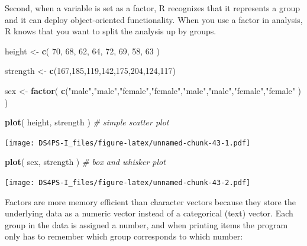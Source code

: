 \documentclass[]{book}
\newenvironment{Shaded}{\begin{snugshade}}{\end{snugshade}}
\newcommand{\CommentTok}[1]{\textcolor[rgb]{0.56,0.35,0.01}{\textit{#1}}}
\newcommand{\DecValTok}[1]{\textcolor[rgb]{0.00,0.00,0.81}{#1}}
\newcommand{\KeywordTok}[1]{\textcolor[rgb]{0.13,0.29,0.53}{\textbf{#1}}}
\newcommand{\NormalTok}[1]{#1}
\newcommand{\StringTok}[1]{\textcolor[rgb]{0.31,0.60,0.02}{#1}}
\theoremstyle{definition}
\theoremstyle{definition}
\theoremstyle{definition}
\theoremstyle{remark}
\begin{document}
Second, when a variable is set as a factor, R recognizes that it
represents a group and it can deploy object-oriented functionality. When
you use a factor in analysis, R knows that you want to split the
analysis up by groups.

\begin{Shaded}
\begin{Highlighting}[]
\NormalTok{height <-}\StringTok{ }\KeywordTok{c}\NormalTok{( }\DecValTok{70}\NormalTok{, }\DecValTok{68}\NormalTok{, }\DecValTok{62}\NormalTok{, }\DecValTok{64}\NormalTok{, }\DecValTok{72}\NormalTok{, }\DecValTok{69}\NormalTok{, }\DecValTok{58}\NormalTok{, }\DecValTok{63}\NormalTok{  )}

\NormalTok{strength <-}\StringTok{ }\KeywordTok{c}\NormalTok{(}\DecValTok{167}\NormalTok{,}\DecValTok{185}\NormalTok{,}\DecValTok{119}\NormalTok{,}\DecValTok{142}\NormalTok{,}\DecValTok{175}\NormalTok{,}\DecValTok{204}\NormalTok{,}\DecValTok{124}\NormalTok{,}\DecValTok{117}\NormalTok{)}

\NormalTok{sex <-}\StringTok{ }\KeywordTok{factor}\NormalTok{( }\KeywordTok{c}\NormalTok{(}\StringTok{"male"}\NormalTok{,}\StringTok{"male"}\NormalTok{,}\StringTok{"female"}\NormalTok{,}\StringTok{"female"}\NormalTok{,}\StringTok{"male"}\NormalTok{,}\StringTok{"male"}\NormalTok{,}\StringTok{"female"}\NormalTok{,}\StringTok{"female"}\NormalTok{ ) )}

\KeywordTok{plot}\NormalTok{( height, strength )   }\CommentTok{# simple scatter plot}
\end{Highlighting}
\end{Shaded}

\texttt{[image: DS4PS-I\_files/figure-latex/unnamed-chunk-43-1.pdf]}

\begin{Shaded}
\begin{Highlighting}[]
\KeywordTok{plot}\NormalTok{( sex, strength )      }\CommentTok{# box and whisker plot       }
\end{Highlighting}
\end{Shaded}

\texttt{[image: DS4PS-I\_files/figure-latex/unnamed-chunk-43-2.pdf]}

Factors are more memory efficient than character vectors because they
store the underlying data as a numeric vector instead of a categorical
(text) vector. Each group in the data is assigned a number, and when
printing items the program only has to remember which group corresponds
to which number:
\end{document}
